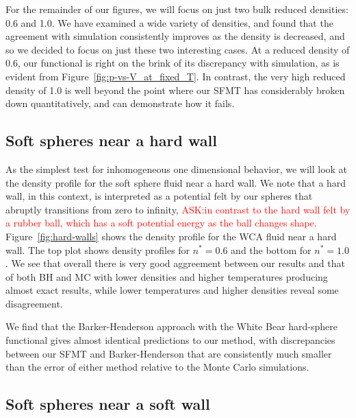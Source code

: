 \documentclass[letterpaper,twocolumn,amsmath,amssymb,prb]{revtex4-1}
\begin{document}
For the remainder of our figures, we will focus on just two bulk
reduced densities: 0.6 and 1.0.  
We have examined a wide variety of
densities, and found that the agreement with simulation consistently
improves as the density is decreased, and so we decided to focus on
just these two interesting cases.  
At a reduced density of 0.6, our
functional is right on the brink of its discrepancy with simulation,
as is evident from Figure~\ref{fig:p-vs-V_at_fixed_T}.  
In contrast, the very high
reduced density of 1.0 is well beyond the point where our SFMT has
considerably broken down quantitatively, and can demonstrate how it
fails. 


\subsection{Soft spheres near a hard wall}

As the simplest test for inhomogeneous one dimensional
behavior, we will look at the density profile for the soft sphere
fluid near a hard wall. We note that a hard wall, in this context, is
interpreted as a potential felt by our spheres that abruptly
transitions from zero to infinity, \textcolor{red}{ASK:in contrast to the hard wall felt
by a rubber ball, which has a soft potential energy as the ball
changes shape.}  Figure~\ref{fig:hard-walls} shows the density profile
for the WCA fluid near a hard wall.  The top plot shows density
profiles for $n^*=0.6$ and the bottom for $n^*=1.0$. We see that 
overall there is very good aggreement between our results and that of both BH and MC
with
lower densities and higher temperatures producing almost exact results, while
lower temperatures and higher densities reveal some disagreement.

We find that the Barker-Henderson approach with the White Bear
hard-sphere functional gives almost identical predictions to our
method, with discrepancies between our SFMT and Barker-Henderson that
are consistently much smaller than the error of either method relative
to the Monte Carlo simulations.

\subsection{Soft spheres near a soft wall}
\end{document}
